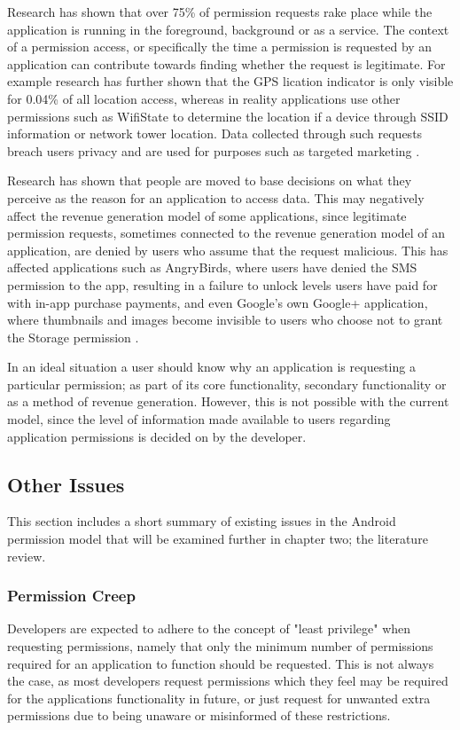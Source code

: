 Research has shown that over 75\% of permission requests rake place while the application is running in the foreground, background or as a service\cite{wijesekera2015android}. The context of a permission access, or specifically the time a permission is requested by an application can contribute towards finding whether the request is legitimate. For example research has further shown that the GPS lication indicator is only visible for 0.04\% of all location access, whereas in reality applications use other permissions such as WifiState to determine the location if a device through SSID information or network tower location. Data collected through such requests breach users privacy and are used for purposes such as targeted marketing \cite{saint201050}.
\smallskip

Research has shown that people are moved to base decisions on what they perceive as the reason for an application to access data\cite{wijesekera2015android}. This may negatively affect the revenue generation model of some applications, since legitimate permission requests, sometimes connected to the revenue generation model of an application, are denied by users who assume that the request malicious. This has affected applications such as AngryBirds, where users have denied the SMS permission to the app, resulting in a failure to unlock levels users have paid for with in-app purchase payments, and even Google's own Google+ application, where thumbnails and images become invisible to users who choose not to grant the Storage permission\cite{u} \cite{w}.
\smallskip

In an ideal situation a user should know why an application is requesting a particular permission; as part of its core functionality, secondary functionality or as a method of revenue generation. However, this is not possible with the current model, since the level of information made available to users regarding application permissions is decided on by the developer. 

\subsection{Other Issues}
This section includes a short summary of existing issues in the Android permission model that will be examined further in chapter two; the literature review.
 
\subsubsection{Permission Creep}
Developers are expected to adhere to the concept of "least privilege" when requesting permissions, namely that only the minimum number of permissions required for an application to function should be requested. This is not always the case, as most developers request permissions which they feel may be required for the applications functionality in future, or just request for unwanted extra permissions due to being unaware or misinformed of these restrictions.

